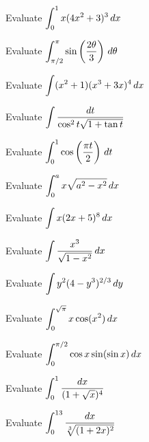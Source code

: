 \documentclass[notes]{subfiles}
\begin{document}
		\begin{ex}
			Evaluate \(\displaystyle \int_0^1 x(4x^2+3)^3\, dx\)
		\end{ex}
			\newpage
			
		\begin{ex}
			Evaluate \(\displaystyle \int_{\pi/2}^\pi \sin\left( \dfrac{2\theta}{3}\right)\,d\theta\)
		\end{ex}
			
		\begin{ex}
			Evaluate \(\displaystyle \int (x^2+1)(x^3+3x)^4\,dx\)
		\end{ex}
			
		\begin{ex}
			Evaluate \(\displaystyle \int \dfrac{dt}{\cos^2t\sqrt{1+\tan t}}\)
		\end{ex}
			\newpage
			
		\begin{ex}
			Evaluate \(\displaystyle \int_0^1\cos\left( \dfrac{\pi t}{2}\right)\, dt\)
		\end{ex}
			
		\begin{ex}
			Evaluate \(\displaystyle \int_0^a x\sqrt{a^2-x^2}\,dx\)
		\end{ex}
			
		\begin{ex}
			Evaluate \(\displaystyle \int x(2x+5)^8\,dx\)
		\end{ex}	
			\newpage
			
		\begin{ex}
			Evaluate \(\displaystyle \int \dfrac{x^3}{\sqrt{1-x^2}}\,dx\)
		\end{ex}
			
		\begin{ex}
			Evaluate \(\displaystyle \int y^2(4-y^3)^{2/3}\,dy\)
		\end{ex}
			
		\begin{ex}
			Evaluate \(\displaystyle \int_0^{\sqrt{\pi}} x\cos (x^2)\, dx\)
		\end{ex}
			\newpage
			
		\begin{ex}
			Evaluate \(\displaystyle \int_0^{\pi/2}\cos x \sin (\sin x)\, dx\)
		\end{ex}
			
		\begin{ex}
			Evaluate \(\displaystyle \int_0^1 \dfrac{dx}{(1+\sqrt{x})^4}\)
		\end{ex}
			
		\begin{ex}
			Evaluate \(\displaystyle \int_0^{13} \dfrac{dx}{\sqrt[3]{(1+2x)^2}}\)
		\end{ex}
			\newpage
			
\end{document}
